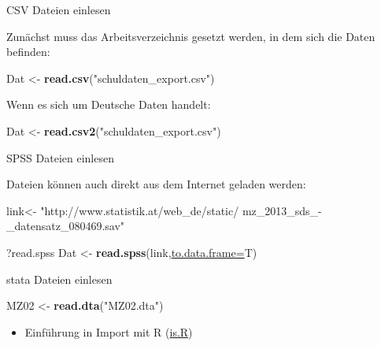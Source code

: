 \documentclass[
  ignorenonframetext,
]{beamer}
\newenvironment{Shaded}{\begin{snugshade}}{\end{snugshade}}
\newcommand{\DataTypeTok}[1]{\textcolor[rgb]{0.74,0.68,0.62}{\underline{#1}}}
\newcommand{\KeywordTok}[1]{\textcolor[rgb]{0.26,0.66,0.93}{\textbf{#1}}}
\newcommand{\NormalTok}[1]{\textcolor[rgb]{0.74,0.68,0.62}{#1}}
\newcommand{\StringTok}[1]{\textcolor[rgb]{0.02,0.61,0.04}{#1}}
\providecommand{\tightlist}{%
  \setlength{\itemsep}{0pt}\setlength{\parskip}{0pt}}
\begin{document}
\begin{frame}[fragile]{CSV Dateien einlesen}
\protect\hypertarget{csv-dateien-einlesen}{}

Zunächst muss das Arbeitsverzeichnis gesetzt werden, in dem sich die
Daten befinden:

\begin{Shaded}
\begin{Highlighting}[]
\NormalTok{Dat <-}\StringTok{ }\KeywordTok{read.csv}\NormalTok{(}\StringTok{"schuldaten_export.csv"}\NormalTok{)}
\end{Highlighting}
\end{Shaded}

Wenn es sich um Deutsche Daten handelt:

\begin{Shaded}
\begin{Highlighting}[]
\NormalTok{Dat <-}\StringTok{ }\KeywordTok{read.csv2}\NormalTok{(}\StringTok{"schuldaten_export.csv"}\NormalTok{)}
\end{Highlighting}
\end{Shaded}

\end{frame}

\begin{frame}[fragile]{SPSS Dateien einlesen}
\protect\hypertarget{spss-dateien-einlesen}{}

Dateien können auch direkt aus dem Internet geladen werden:

\begin{Shaded}
\begin{Highlighting}[]
\NormalTok{link<-}\StringTok{ "http://www.statistik.at/web_de/static/}
\StringTok{mz_2013_sds_-_datensatz_080469.sav"}

\NormalTok{?read.spss}
\NormalTok{Dat <-}\StringTok{ }\KeywordTok{read.spss}\NormalTok{(link,}\DataTypeTok{to.data.frame=}\NormalTok{T)}
\end{Highlighting}
\end{Shaded}

\end{frame}

\begin{frame}[fragile]{stata Dateien einlesen}
\protect\hypertarget{stata-dateien-einlesen}{}

\begin{Shaded}
\begin{Highlighting}[]
\NormalTok{MZ02 <-}\StringTok{ }\KeywordTok{read.dta}\NormalTok{(}\StringTok{"MZ02.dta"}\NormalTok{)}
\end{Highlighting}
\end{Shaded}

\begin{itemize}
\tightlist
\item
  Einführung in Import mit R
  (\href{http://is-r.tumblr.com/post/37181850668/reading-writing-stata-dta-files-with-foreign}{is.R})
\end{itemize}

\end{frame}
\end{document}
